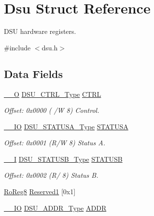 \hypertarget{struct_dsu}{}\section{Dsu Struct Reference}
\label{struct_dsu}


D\+SU hardware registers.  




{\ttfamily \#include $<$dsu.\+h$>$}

\subsection*{Data Fields}
\begin{DoxyCompactItemize}
\item 
\mbox{\hyperlink{core__cm0plus_8h_a7e25d9380f9ef903923964322e71f2f6}{\+\_\+\+\_\+O}} \mbox{\hyperlink{union_d_s_u___c_t_r_l___type}{D\+S\+U\+\_\+\+C\+T\+R\+L\+\_\+\+Type}} \mbox{\hyperlink{struct_dsu_a24e11e45738520b3929f2a2e0a1baf28}{C\+T\+RL}}
\begin{DoxyCompactList}\small\item\em Offset\+: 0x0000 ( /W 8) Control. \end{DoxyCompactList}\item 
\mbox{\hyperlink{core__cm0plus_8h_aec43007d9998a0a0e01faede4133d6be}{\+\_\+\+\_\+\+IO}} \mbox{\hyperlink{union_d_s_u___s_t_a_t_u_s_a___type}{D\+S\+U\+\_\+\+S\+T\+A\+T\+U\+S\+A\+\_\+\+Type}} \mbox{\hyperlink{struct_dsu_a6759acda48815d98f344c56148ba52ac}{S\+T\+A\+T\+U\+SA}}
\begin{DoxyCompactList}\small\item\em Offset\+: 0x0001 (R/W 8) Status A. \end{DoxyCompactList}\item 
\mbox{\hyperlink{core__cm0plus_8h_af63697ed9952cc71e1225efe205f6cd3}{\+\_\+\+\_\+I}} \mbox{\hyperlink{union_d_s_u___s_t_a_t_u_s_b___type}{D\+S\+U\+\_\+\+S\+T\+A\+T\+U\+S\+B\+\_\+\+Type}} \mbox{\hyperlink{struct_dsu_a6184b4b81bad58bef585f6ecd1dbe027}{S\+T\+A\+T\+U\+SB}}
\begin{DoxyCompactList}\small\item\em Offset\+: 0x0002 (R/ 8) Status B. \end{DoxyCompactList}\item 
\mbox{\hyperlink{group___s_a_m_d21_e15_a__definitions_ga0d957f1433aaf5d70e4dc2b68288442d}{Ro\+Reg8}} \mbox{\hyperlink{struct_dsu_a092866123ac46d0985136e4dca2f36f4}{Reserved1}} \mbox{[}0x1\mbox{]}
\item 
\mbox{\hyperlink{core__cm0plus_8h_aec43007d9998a0a0e01faede4133d6be}{\+\_\+\+\_\+\+IO}} \mbox{\hyperlink{union_d_s_u___a_d_d_r___type}{D\+S\+U\+\_\+\+A\+D\+D\+R\+\_\+\+Type}} \mbox{\hyperlink{struct_dsu_a3663d6824eee85773d00a11395edd46d}{A\+D\+DR}}

\end{DoxyCompactItemize}

